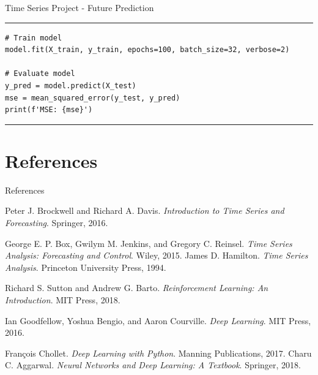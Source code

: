 \documentclass[aspectratio=169, hideothersubsections]{beamer}
\begin{document}
\begin{frame}[fragile]{Time Series Project - Future Prediction}
\rule{\textwidth}{1pt}
\scriptsize
\begin{verbatim}
# Train model
model.fit(X_train, y_train, epochs=100, batch_size=32, verbose=2)

# Evaluate model
y_pred = model.predict(X_test)
mse = mean_squared_error(y_test, y_pred)
print(f'MSE: {mse}')
\end{verbatim}
\rule{\textwidth}{1pt}
\end{frame}

\section*{References}
\begin{frame}{References}
  \begin{thebibliography}{10}
    \beamertemplatebookbibitems

     Peter J. Brockwell and Richard A. Davis. \textit{Introduction to Time Series and Forecasting}. Springer, 2016.

     George E. P. Box, Gwilym M. Jenkins, and Gregory C. Reinsel. \textit{Time Series Analysis: Forecasting and Control}. Wiley, 2015.
     James D. Hamilton. \textit{Time Series Analysis}. Princeton University Press, 1994.

     Richard S. Sutton and Andrew G. Barto. \textit{Reinforcement Learning: An Introduction}. MIT Press, 2018.

     Ian Goodfellow, Yoshua Bengio, and Aaron Courville. \textit{Deep Learning}. MIT Press, 2016.

     François Chollet. \textit{Deep Learning with Python}. Manning Publications, 2017.
     Charu C. Aggarwal. \textit{Neural Networks and Deep Learning: A Textbook}. Springer, 2018.

  \end{thebibliography}
\end{frame}
\end{document}
